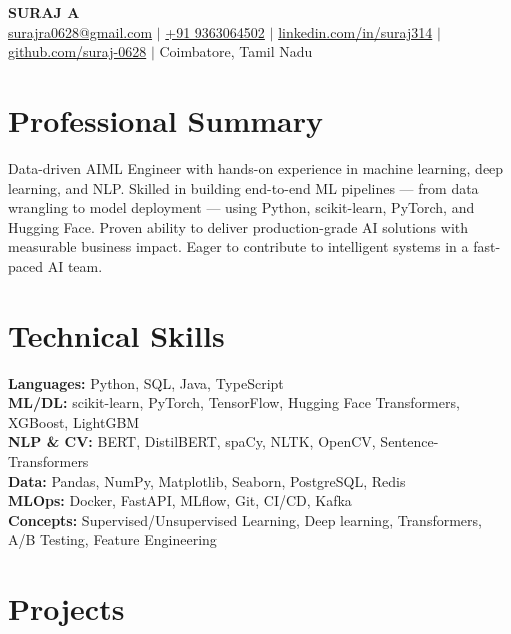 \documentclass[10pt]{article}
\begin{document}
\begin{center}
  {\LARGE\textbf{SURAJ A}}\\[4pt]
  \small
  \href{mailto:surajra0628@gmail.com}{surajra0628@gmail.com} $|$
  \href{tel:+919363064502}{+91 9363064502} $|$
  \href{https://linkedin.com/in/suraj314}{linkedin.com/in/suraj314} $|$
  \href{https://github.com/suraj-0628}{github.com/suraj-0628} $|$
  Coimbatore, Tamil Nadu
\end{center}

\section{Professional Summary}
Data-driven AIML Engineer with hands-on experience in machine learning, deep learning, and NLP. Skilled in building end-to-end ML pipelines — from data wrangling to model deployment — using Python, scikit-learn, PyTorch, and Hugging Face. Proven ability to deliver production-grade AI solutions with measurable business impact. Eager to contribute to intelligent systems in a fast-paced AI team.

\section{Technical Skills}
\textbf{Languages:} Python, SQL, Java, TypeScript \\
\textbf{ML/DL:} scikit-learn, PyTorch, TensorFlow, Hugging Face Transformers, XGBoost, LightGBM \\
\textbf{NLP \& CV:} BERT, DistilBERT, spaCy, NLTK, OpenCV, Sentence-Transformers \\
\textbf{Data:} Pandas, NumPy, Matplotlib, Seaborn, PostgreSQL, Redis \\
\textbf{MLOps:} Docker, FastAPI, MLflow, Git, CI/CD, Kafka \\
\textbf{Concepts:} Supervised/Unsupervised Learning, Deep learning, Transformers, A/B Testing, Feature Engineering

\section{Projects}
\end{document}

